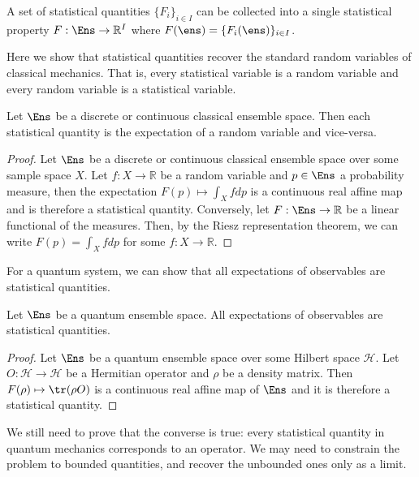 \begin{mathSection}
\begin{coro}
	A set of statistical quantities $\{F_i\}_{i \in I}$ can be collected into a single statistical property $F : \Ens \to \mathbb{R}^I$ where $F(\ens) = \{F_i(\ens)\}_{i \in I}$.
\end{coro}
\end{mathSection}

Here we show that statistical quantities recover the standard random variables of classical mechanics. That is, every statistical variable is a random variable and every random variable is a statistical variable.

\begin{mathSection}
\begin{prop}
	Let $\Ens$ be a discrete or continuous classical ensemble space. Then each statistical quantity is the expectation of a random variable and vice-versa.
\end{prop}

\begin{proof}
	Let $\Ens$ be a discrete or continuous classical ensemble space over some sample space $X$. Let $f : X \to \mathbb{R}$ be a random variable and $p \in \Ens$ a probability measure, then the expectation $F(p) \mapsto \int_{X} f dp$ is a continuous real affine map and is therefore a statistical quantity. Conversely, let $F : \Ens \to \mathbb{R}$ be a linear functional of the measures. Then, by the Riesz representation theorem, we can write $F(p) = \int_{X} f dp$ for some $f : X \to \mathbb{R}$.
\end{proof}
\end{mathSection}

For a quantum system, we can show that all expectations of observables are statistical quantities.

\begin{mathSection}
\begin{prop}
	Let $\Ens$ be a quantum ensemble space. All expectations of observables are statistical quantities.
\end{prop}

\begin{proof}
	Let $\Ens$ be a quantum ensemble space over some Hilbert space $\mathcal{H}$. Let $O : \mathcal{H} \to \mathcal{H}$ be a Hermitian operator and $\rho$ be a density matrix. Then $F(\rho) \mapsto \tr(\rho O)$ is a continuous real affine map of $\Ens$ and it is therefore a statistical quantity.
\end{proof}

\begin{remark}
	We still need to prove that the converse is true: every statistical quantity in quantum mechanics corresponds to an operator. We may need to constrain the problem to bounded quantities, and recover the unbounded ones only as a limit.
\end{remark}
\end{mathSection}


